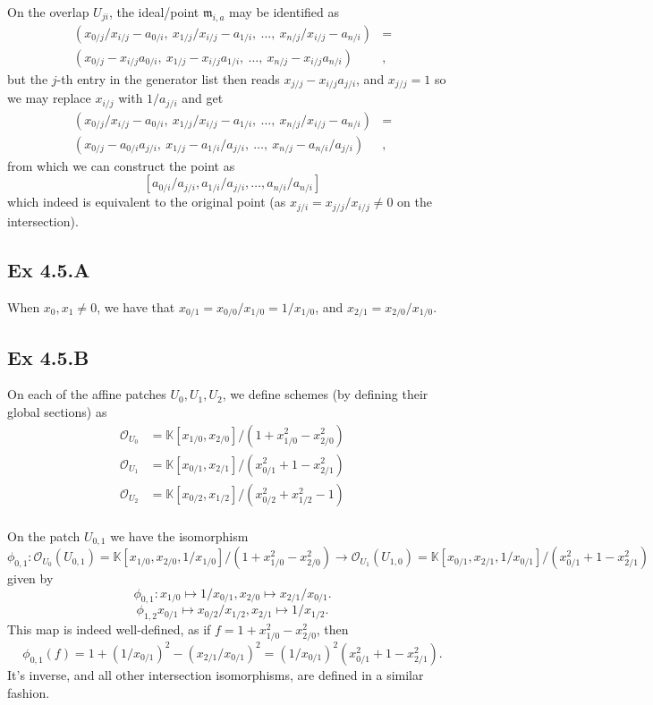 \documentclass{article}
\theoremstyle{definition}
\newcommand{\K}{\mathbb{K}}
\newcommand{\oo}{\mathcal{O}}
\begin{document}
On the overlap $U_{ji}$, the ideal/point $\mathfrak{m}_{i, a}$ may be
identified as
\begin{align*}
	(x_{0/j}/x_{i/j} - a_{0/i},\ x_{1/j}/x_{i/j} - a_{1/i},\ \ldots,\ x_{n/j}/x_{i/j} - a_{n/i}) 
	&= \\
	(x_{0/j} - x_{i/j}a_{0/i},\ x_{1/j} - x_{i/j}a_{1/i},\ \ldots,\ x_{n/j} - x_{i/j}a_{n/i})
	&,
\end{align*} 
but the $j$-th entry in the generator list then reads $x_{j/j} - x_{i/j} a_{j/i}$,
and $x_{j/j}=1$ so we may replace $x_{i/j}$ with $1/a_{j/i}$ and get
\begin{align*}
	(x_{0/j}/x_{i/j} - a_{0/i},\ x_{1/j}/x_{i/j} - a_{1/i},\ \ldots,\ x_{n/j}/x_{i/j} - a_{n/i}) 
	&= \\
	(x_{0/j} - a_{0/i}a_{j/i},\ x_{1/j} - a_{1/i}/a_{j/i},\ \ldots,\ x_{n/j} - a_{n/i}/a_{j/i})
	&,
\end{align*}
from which we can construct the point as
\[
	[a_{0/i}/a_{j/i}, a_{1/i}/a_{j/i}, \ldots, a_{n/i}/a_{n/i}]
\] 
which indeed is equivalent to the original point (as $x_{j/i} = x_{j/j}/x_{i/j}
\not = 0$ on the intersection).

\subsection*{Ex 4.5.A}

When $x_0, x_1 \not = 0$, we have that $x_{0/1} = x_{0/0}/x_{1/0} = 1/x_{1/0}$,
and $x_{2/1} = x_{2/0}/x_{1/0}$.

\subsection*{Ex 4.5.B}

On each of the affine patches $U_0, U_1, U_2$, we define schemes (by defining
their global sections) as 
\begin{align*}
	\oo_{U_0} &= \K[x_{1/0},x_{2/0}]/(1 + x_{1/0}^2 - x_{2/0}^2) \\
	\oo_{U_1} &= \K[x_{0/1},x_{2/1}]/(x_{0/1}^2 + 1 - x_{2/1}^2) \\
	\oo_{U_2} &= \K[x_{0/2},x_{1/2}]/(x_{0/2}^2 + x_{1/2}^2 - 1) \\
\end{align*}

On the patch $U_{0,1}$ we have the isomorphism
\[
	\phi_{0,1} 
	: 
	\oo_{U_0}(U_{0,1}) = \K[x_{1/0},x_{2/0},1/x_{1/0}] / (1 + x_{1/0}^2 - x_{2/0}^2)
	\to
	\oo_{U_1}(U_{1,0}) = \K[x_{0/1},x_{2/1},1/x_{0/1}] / (x_{0/1}^2 + 1 - x_{2/1}^2)
\]
given by
\[
	\phi_{0,1}
	: 
	x_{1/0} \mapsto 1/x_{0/1},
	x_{2/0} \mapsto x_{2/1}/x_{0/1}.
\] 
\[
	\phi_{1,2}
	x_{0/1} \mapsto x_{0/2}/x_{1/2}, 
	x_{2/1} \mapsto 1/x_{1/2}.
\] 
This map is indeed well-defined, as if $f = 1 + x_{1/0}^2 - x_{2/0}^2$,
then
\[
	\phi_{0,1}(f)
	=
	1 + (1/x_{0/1})^{2} - (x_{2/1}/x_{0/1})^{2}
	=
	(1/x_{0/1})^{2}
	(x_{0/1}^{2} + 1 - x_{2/1}^{2}).
\]
It's inverse, and all other intersection isomorphisms, are defined in a similar
fashion. \\
\end{document}
